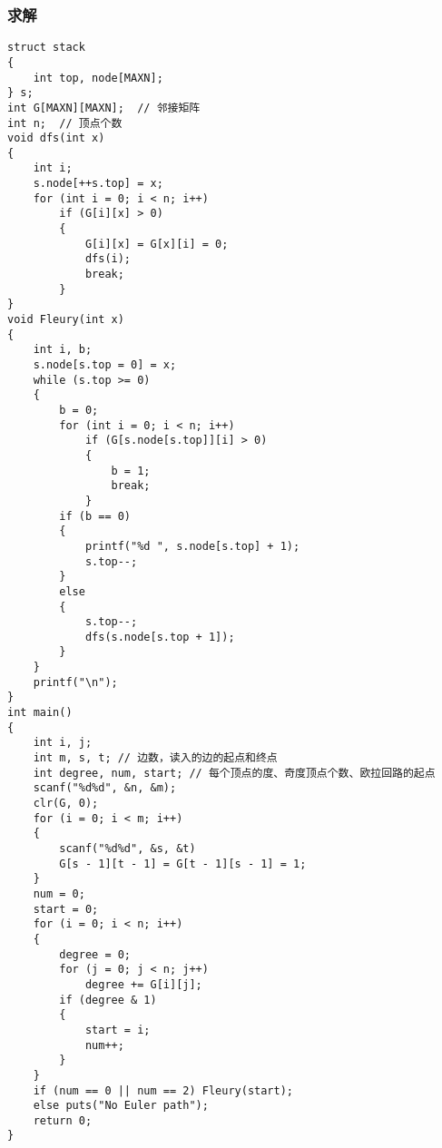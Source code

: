 \documentclass[a4]{article}
\begin{document}
\subsubsection{求解}
\begin{lstlisting}
struct stack
{
    int top, node[MAXN];
} s;
int G[MAXN][MAXN];  // 邻接矩阵
int n;  // 顶点个数
void dfs(int x)
{
    int i;
    s.node[++s.top] = x;
    for (int i = 0; i < n; i++)
        if (G[i][x] > 0)
        {
            G[i][x] = G[x][i] = 0;
            dfs(i);
            break;
        }
}
void Fleury(int x)
{
    int i, b;
    s.node[s.top = 0] = x;
    while (s.top >= 0)
    {
        b = 0;
        for (int i = 0; i < n; i++)
            if (G[s.node[s.top]][i] > 0)
            {
                b = 1;
                break;
            }
        if (b == 0)
        {
            printf("%d ", s.node[s.top] + 1);
            s.top--;
        }
        else
        {
            s.top--;
            dfs(s.node[s.top + 1]);
        }
    }
    printf("\n");
}
int main()
{
    int i, j;
    int m, s, t; // 边数，读入的边的起点和终点
    int degree, num, start; // 每个顶点的度、奇度顶点个数、欧拉回路的起点
    scanf("%d%d", &n, &m);
    clr(G, 0);
    for (i = 0; i < m; i++)
    {
        scanf("%d%d", &s, &t)
        G[s - 1][t - 1] = G[t - 1][s - 1] = 1;
    }
    num = 0;
    start = 0;
    for (i = 0; i < n; i++)
    {
        degree = 0;
        for (j = 0; j < n; j++)
            degree += G[i][j];
        if (degree & 1)
        {
            start = i;
            num++;
        }
    }
    if (num == 0 || num == 2) Fleury(start);
    else puts("No Euler path");
    return 0;
}
\end{lstlisting}
\end{document}
